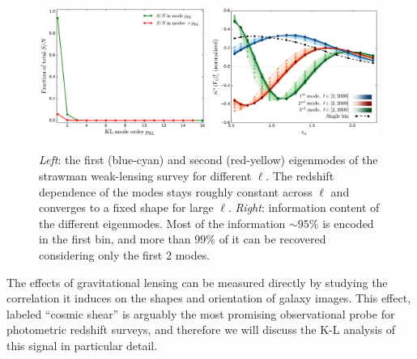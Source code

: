 \documentclass[twocolumn,amsfont,amssymb,amsmath, showpacs,balancelastpage, nofootinbib]{revtex4-1}
\begin{document}
    \begin{figure}
      \centering
      \includegraphics[width=0.49\textwidth]{Figs/information_wl}
      \includegraphics[width=0.49\textwidth]{Figs/kl_modes_wl}
      \caption{{\sl Left}: the first (blue-cyan) and second (red-yellow) eigenmodes of the strawman weak-lensing survey for different $\ell$. The redshift dependence of the modes stays roughly constant across $\ell$ and converges to a fixed shape for large $\ell$. {\sl Right}: information content of the different eigenmodes. Most of the information $\sim95\%$ is encoded in the first bin, and more than $99\%$ of it can be recovered considering only the first 2 modes.}\label{fig:kl_wl}
    \end{figure}
    The effects of gravitational lensing can be measured directly by studying the correlation it induces on the shapes and orientation of galaxy images. This effect, labeled ``cosmic shear'' is arguably the most promising observational probe for photometric redshift surveys, and therefore we will discuss the K-L analysis of this signal in particular detail.
    
\end{document}
